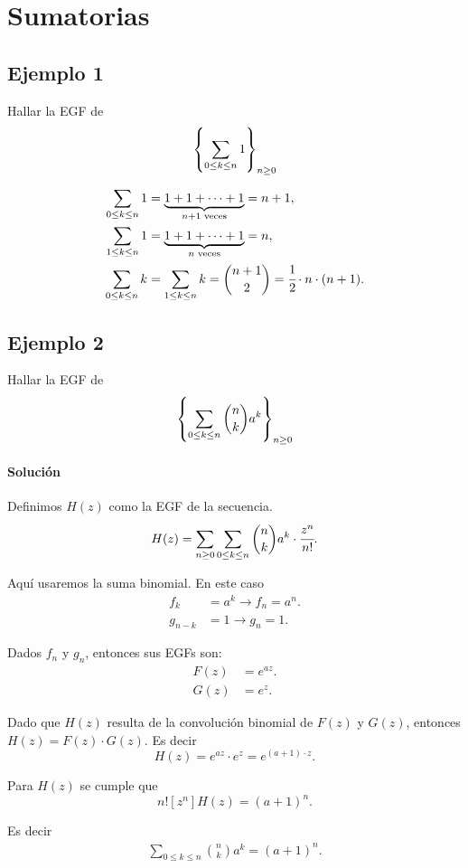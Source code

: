 \section{Sumatorias}

\subsection{Ejemplo 1}

Hallar la EGF de
$$\left\{\sum_{0\leq k\leq n}{1}\right\}_{n\geq0}$$

\begin{align*}
\sum_{0\leq k\leq n}{1}&=\underset{n+1\text{ veces}}{\underbrace{1+1+\cdots+1}}=n+1,\\
\sum_{1\leq k\leq n}{1}&=\underset{n\text{ veces}}{\underbrace{1+1+\cdots+1}}=n,\\
\sum_{0\leq k\leq n}{k}&=\sum_{1\leq k\leq n}{k}=\binom{n+1}{2}=\cfrac{1}{2}\cdot n\cdot(n+1).
\end{align*}

\subsection{Ejemplo 2}
Hallar la EGF de
$$\left\{\sum_{0\leq k\leq n}{\binom{n}{k}a^k}\right\}_{n\geq0}$$

\paragraph{Solución}
Definimos $H(z)$ como la EGF de la secuencia.
\begin{align*}
H(z)=\sum_{n\geq0}{\sum_{0\leq k\leq n}{\binom{n}{k}a^k}\cdot\cfrac{z^{n}}{n!}}.
\end{align*}

Aquí usaremos la suma binomial. En este caso
\begin{align*}
f_k&=a^k\rightarrow f_n=a^n.\\
g_{n-k}&=1\rightarrow g_n=1.
\end{align*}

Dados $f_n$ y $g_n$, entonces sus EGFs son:
\begin{align*}
F(z)&=e^{az}.\\
G(z)&=e^z.
\end{align*}

Dado que $H(z)$ resulta de la convolución binomial de $F(z)$ y $G(z)$, entonces $H(z)=F(z)\cdot G(z)$.
Es decir
$$H(z)=e^{az}\cdot e^z=e^{(a+1)\cdot z}.$$

Para $H(z)$ se cumple que
$$n![z^n]H(z)=(a+1)^n.$$

Es decir
\begin{align*}
\sum_{0\leq k\leq n}{\binom{n}{k}a^k}=(a+1)^n.
\end{align*}

